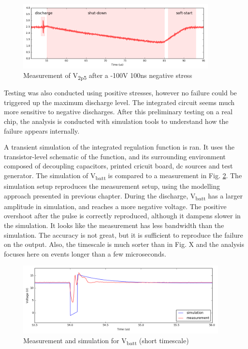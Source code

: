 \begin{figure}[!h]
  \centering
  \includegraphics[width=0.9\textwidth]{src/3/figures/v2p5_measure.png}
  \caption{Measurement of V\textsubscript{2p5} after a -100V 100ns negative stress}
  \label{fig:meas-reset-v2p5}
\end{figure}

Testing was also conducted using positive stresses, however no failure could be triggered up the maximum discharge level.
The integrated circuit seems much more sensitive to negative discharges.
After this preliminary testing on a real chip, the analysis is conducted with simulation tools to understand how the failure appears internally.

A transient simulation of the integrated regulation function is ran.
It uses the transistor-level schematic of the function, and its surrounding environment composed of decoupling capacitors, printed cricuit board, \gls{dc} sources and test generator.
The simulation of V\textsubscript{batt} is compared to a measurement in Fig. \ref{fig:wvf-vbatt}.
The simulation setup reproduces the measurement setup, using the modelling approach presented in previous chapter.
During the discharge, V\textsubscript{batt} has a larger amplitude in simulation, and reaches a more negative voltage.
The positive overshoot after the pulse is correctly reproduced, although it dampens slower in the simulation.
It looks like the measurement has less bandwidth than the simulation.
The accuracy is not great, but it is sufficient to reproduce the failure on the output.
Also, the timescale is much sorter than in Fig. X and the analysis focuses here on events longer than a few microseconds.

\begin{figure}[!h]
  \centering
  \includegraphics[width=0.95\textwidth]{src/3/figures/vbatt.png}
  \caption{Measurement and simulation for V\textsubscript{batt} (short timescale)}
  \label{fig:wvf-vbatt}
\end{figure}

